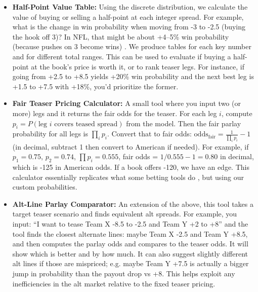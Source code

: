 \documentclass[12pt]{article}
\begin{document}
\begin{itemize}
    \item \textbf{Half-Point Value Table:} Using the discrete distribution, we calculate the value of buying or selling a half-point at each integer spread. For example, what is the change in win probability when moving from -3 to -2.5 (buying the hook off 3)? In NFL, that might be about +4--5\% win probability (because pushes on 3 become wins) \cite{Walsh2024}. We produce tables for each key number and for different total ranges. This can be used to evaluate if buying a half-point at the book’s price is worth it, or to rank teaser legs. For instance, if going from +2.5 to +8.5 yields +20\% win probability and the next best leg is +1.5 to +7.5 with +18\%, you’d prioritize the former.
    
    \item \textbf{Fair Teaser Pricing Calculator:} A small tool where you input two (or more) legs and it returns the fair odds for the teaser. For each leg $i$, compute $p_i = P(\text{leg }i \text{ covers teased spread})$ from the model. Then the fair parlay probability for all legs is $\prod_i p_i$. Convert that to fair odds: $\text{odds}_{\text{fair}} = \frac{1}{\prod_i p_i} - 1$ (in decimal, subtract 1 then convert to American if needed). For example, if $p_1=0.75$, $p_2=0.74$, $\prod p_i = 0.555$, fair odds = $1/0.555 - 1 = 0.80$ in decimal, which is -125 in American odds. If a book offers -120, we have an edge. This calculator essentially replicates what some betting tools do \cite{Andrews2024}, but using our custom probabilities.
    
    \item \textbf{Alt-Line Parlay Comparator:} An extension of the above, this tool takes a target teaser scenario and finds equivalent alt spreads. For example, you input: “I want to tease Team X -8.5 to -2.5 and Team Y +2 to +8” and the tool finds the closest alternate lines: maybe Team X -2.5 and Team Y +8.5, and then computes the parlay odds and compares to the teaser odds. It will show which is better and by how much. It can also suggest slightly different alt lines if those are mispriced; e.g. maybe Team Y +7.5 is actually a bigger jump in probability than the payout drop vs +8. This helps exploit any inefficiencies in the alt market relative to the fixed teaser pricing.
    

\end{itemize}
\end{document}
